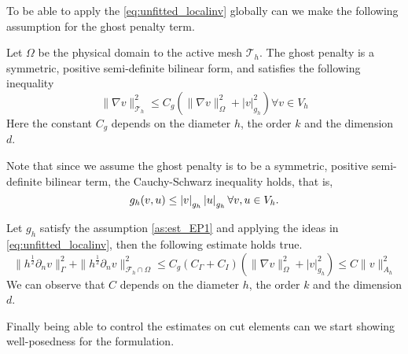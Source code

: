 To be able to apply the \eqref{eq:unfitted_localinv} globally can we make the following assumption for the ghost penalty term.

\begin{assumption}[EP1]
    \label{as:est_EP1}
    Let $\Omega $ be the physical domain to the active mesh $\mathcal{T} _{h}$. The ghost penalty is a symmetric, positive semi-definite bilinear form, and satisfies the following inequality  \[
    \| \nabla v \|_{ \mathcal{T}_{h}  }^{ 2 }  \le C_{g} ( \| \nabla v \|_{ \Omega  }^{ 2 }  + \left\lvert v  \right\rvert _{ g_{h} }^{ 2 } ) \forall v \in  V_{h}
    \]
    Here the constant $C_{g}$ depends on the diameter $h$, the order $k $ and the dimension $d$.
\end{assumption}
\begin{remark}
Note that since we assume the ghost penalty is to be a symmetric, positive semi-definite bilinear term, the Cauchy-Schwarz inequality holds, that is,\[
g_{h}( v,u)  \le \left\lvert  v  \right\rvert _{g_{h}} \left\lvert  u  \right\rvert_{g_{h}} \forall v,u \in V_{h}.
\]
\end{remark}


\begin{corollary}
    \label{cor:g_h_inverste_results}
    Let $g_{h}$ satisfy the assumption \ref{as:est_EP1} and applying the ideas in \eqref{eq:unfitted_localinv}, then the following estimate holds true.
    \[
    \| h^{\frac{1}{2}} \partial _{n} v \|_{ \Gamma   }^{ 2 } + \| h^{\frac{1}{2}} \partial _{n} v \|_{ \mathcal{F} _{h} \cap \Omega  }^{ 2 }  \le  C_{g}( C_{\Gamma } + C_{I}) ( \| \nabla v  \|_{ \Omega   }^{2  }
     + \left\lvert v \right\rvert _{g_{h}}^{2}) \le C \| v \|_{ A_{h} }^{ 2 }
    \]
    We can observe that $C$ depends on the diameter $h$, the order $k $ and the dimension $d$.
\end{corollary}


Finally being able to control the estimates on cut elements can we start showing well-posedness for the formulation.

